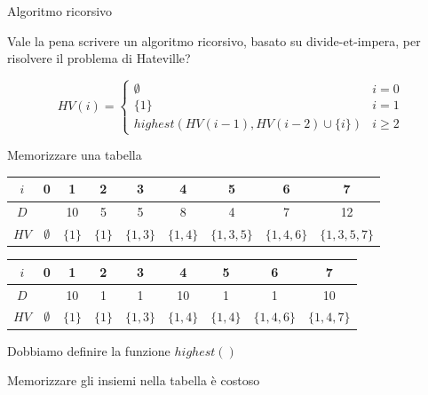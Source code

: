 \begin{frame}{Algoritmo ricorsivo}

\vspace{-9pt}
\begin{myboxtitle}[Domanda]
Vale la pena scrivere un algoritmo ricorsivo, basato su divide-et-impera,
per risolvere il problema di Hateville?
\end{myboxtitle}

\bigskip
\begin{overprint}
\[
HV(i) = \begin{cases}
  \emptyset & i=0 \\
  \{ 1 \} & i=1 \\
  \mathit{highest}(HV(i-1), HV(i-2) \cup \{ i \}) & i \geq 2
  \end{cases}
\]
\end{overprint}

\end{frame}

\begin{frame}{Memorizzare una tabella}

\vspace{-9pt}
\begin{myboxtitle}[Esempi]
\small
\medskip
\begin{tabular}{|c|c|c|c|c|c|c|c|c|}
\hline
$i$ & 0 & 1 & 2 & 3 & 4 & 5 & 6 & 7 \\\hline
$D$ &   & 10 & 5 & 5 & 8 & 4 & 7 & 12 \\\hline
$HV$ & $\emptyset$ & $\{ 1 \}$ & $\{ 1 \}$ & $\{ 1,3 \}$ & $\{ 1,4 \}$ & $\{ 1,3,5 \}$ & $ \{ 1,4,6 \}$ & $\{ 1,3,5,7 \}$ \\\hline
\end{tabular}

\medskip
\begin{tabular}{|c|c|c|c|c|c|c|c|c|}
\hline
$i$ & 0 & 1 & 2 & 3 & 4 & 5 & 6 & 7 \\\hline
$D$ &   & 10 & 1 & 1 & 10 & 1 & 1 & 10 \\\hline
$HV$ & $\emptyset$ & $\{ 1 \}$ & $\{ 1 \}$ & $\{ 1,3 \}$ & $\{ 1,4 \}$ & $\{ 1, 4 \}$ & $ \{ 1,4,6 \}$ & $\{ 1,4,7 \}$ \\\hline
\end{tabular}
\end{myboxtitle}

\begin{myboxtitle}[Problemi]
\BIL
\item Dobbiamo definire la funzione $\mathit{highest}()$
\item \alert{Memorizzare gli insiemi nella tabella è costoso}
\EIL
\end{myboxtitle}

\end{frame}

